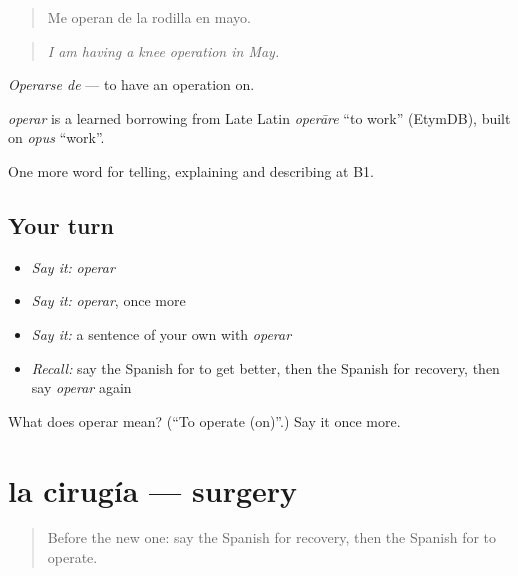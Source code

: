 \begin{quote}
Me operan de la rodilla en mayo.
\end{quote}

\begin{quote}
\emph{I am having a knee operation in May.}
\end{quote}

\emph{Operarse de} — to have an operation on.

\begin{cousinweb}
\emph{operar} is a learned borrowing from Late Latin \emph{operāre} \textquotedblleft{}to work\textquotedblright{} (EtymDB), built on \emph{opus} \textquotedblleft{}work\textquotedblright{}.
\end{cousinweb}

\begin{grammarlens}[title={What you've built}]
One more word for telling, explaining and describing at B1.
\end{grammarlens}

\subsection*{Your turn}
\begin{itemize}
\raggedright
  \item \emph{Say it:} \emph{operar}
  \item \emph{Say it:} \emph{operar}, once more
  \item \emph{Say it:} a sentence of your own with \emph{operar}
  \item \emph{Recall:} say the Spanish for to get better, then the Spanish for recovery, then say \emph{operar} again
\end{itemize}

\begin{tcolorbox}[breakable,colback=teal!4,colframe=teal!35!black,title={Before you move on}]
What does operar mean? (\textquotedblleft{}To operate (on)\textquotedblright{}.) Say it once more.
\end{tcolorbox}
\section[la cirugía]{la cirugía — surgery}

\label{lesson:ES-C739-cirugia}



\begin{quote}
Before the new one: say the Spanish for recovery, then the Spanish for to operate.
\end{quote}

